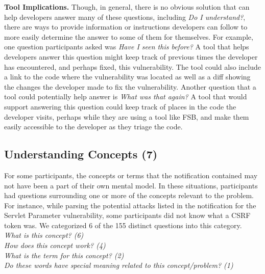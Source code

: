 \documentclass[conference]{IEEEtran}
\begin{document}
\noindent\textbf{Tool Implications.}
Though, in general, there is no obvious solution that can help developers answer many of these questions, including \textit{Do I understand?}, there are ways to provide information or instructions developers can follow to more easily determine the answer to some of them for themselves. 
For example, one question participants asked was \textit{Have I seen this before?}
A tool that helps developers answer this question might keep track of previous times the developer has encountered, and perhaps fixed, this vulnerability. 
The tool could also include a link to the code where the vulnerability was located as well as a diff showing the changes the developer made to fix the vulnerability.
Another question that a tool could potentially help answer is \textit{What was that again?} 
A tool that would support answering this question could keep track of places in the code the developer visits, perhaps while they are using a tool like FSB, and make them easily accessible to the developer as they triage the code.




\noindent\subsection{\textbf{Understanding Concepts (7)}}\label{uc}

For some participants, the concepts or terms that the notification contained may not have been a part of their own mental model. 
In these situations, participants had questions surrounding one or more of the concepts relevant to the problem.
For instance, while parsing the potential attacks listed in the notification for the Servlet Parameter vulnerability, some participants did not know what a CSRF token was.
We categorized 6 of the 155 distinct questions into this category. 
\\

\noindent\emph{What is this concept? (6)} \\
\emph{How does this concept work? (4)} \\
\emph{What is the term for this concept? (2)} \\
\emph{Do these words have special meaning related to this concept/problem? (1)} \\
\end{document}
